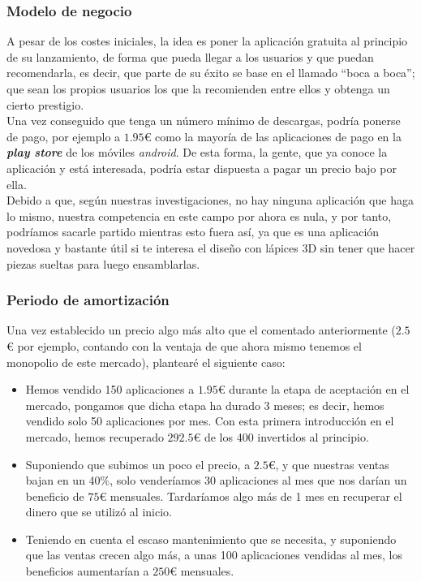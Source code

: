 \documentclass[12pt,a4paper]{article}
\begin{document}
\subsubsection{Modelo de negocio}

A pesar de los costes iniciales, la idea es poner la aplicación gratuita al principio de su lanzamiento, de forma que pueda llegar a los usuarios y que puedan recomendarla, es decir, que parte de su éxito se base en el llamado ``boca a boca''; que sean los propios usuarios los que la recomienden entre ellos y obtenga un cierto prestigio.\\

Una vez conseguido que tenga un número mínimo de descargas, podría ponerse de pago, por ejemplo a $1.95$€ como la mayoría de las aplicaciones de pago en la \textbf{\textit{play store}} de los móviles \textit{android}. De esta forma, la gente, que ya conoce la aplicación y está interesada, podría estar dispuesta a pagar un precio bajo por ella.\\

Debido a que, según nuestras investigaciones, no hay ninguna aplicación que haga lo mismo, nuestra competencia en este campo por ahora es nula, y por tanto, podríamos sacarle partido mientras esto fuera así, ya que es una aplicación novedosa y bastante útil si te interesa el diseño con lápices 3D sin tener que hacer piezas sueltas para luego ensamblarlas.

\subsubsection{Periodo de amortización}

Una vez establecido un precio algo más alto que el comentado anteriormente ($2.5$€ por ejemplo, contando con la ventaja de que ahora mismo tenemos el monopolio de este mercado), plantearé el siguiente caso:

\begin{itemize}
    \item Hemos vendido 150 aplicaciones a $1.95$€ durante la etapa de aceptación en el mercado, pongamos que dicha etapa ha durado 3 meses; es decir, hemos vendido solo 50 aplicaciones por mes. Con esta primera introducción en el mercado, hemos recuperado $292.5$€ de los 400 invertidos al principio.
    \item Suponiendo que subimos un poco el precio, a $2.5$€, y que nuestras ventas bajan en un 40\%, solo venderíamos 30 aplicaciones al mes que nos darían un beneficio de $75$€ mensuales. Tardaríamos algo más de 1 mes en recuperar el dinero que se utilizó al inicio.
    \item Teniendo en cuenta el escaso mantenimiento que se necesita, y suponiendo que las ventas crecen algo más, a unas 100 aplicaciones vendidas al mes, los beneficios aumentarían a $250$€ mensuales.
\end{itemize}
\end{document}
